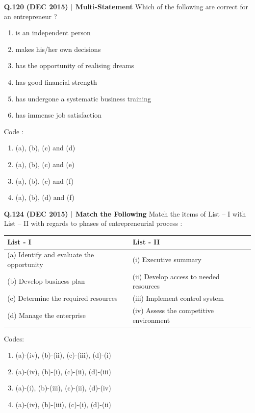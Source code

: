 \documentclass{article}
\begin{document}
\textbf{Q.120 (DEC 2015) | Multi-Statement}
Which of the following are correct for an entrepreneur ?
\begin{enumerate}[label=(\alph*)]
    \item is an independent person
    \item makes his/her own decisions
    \item has the opportunity of realising dreams
    \item has good financial strength
    \item has undergone a systematic business training
    \item has immense job satisfaction
\end{enumerate}
Code :
\begin{enumerate}[label=(\arabic*)]
    \item (a), (b), (c) and (d)
    \item (a), (b), (c) and (e)
    \item (a), (b), (c) and (f)
    \item (a), (b), (d) and (f)
\end{enumerate}

\textbf{Q.124 (DEC 2015) | Match the Following}
Match the items of List – I with List – II with regards to phases of entrepreneurial process :
\begin{tabularx}{\linewidth}{@{} l X @{}}
    \toprule
    \textbf{List - I} & \textbf{List - II} \\
    \midrule
    (a) Identify and evaluate the opportunity & (i) Executive summary \\
    (b) Develop business plan & (ii) Develop access to needed resources \\
    (c) Determine the required resources & (iii) Implement control system \\
    (d) Manage the enterprise & (iv) Assess the competitive environment \\
    \bottomrule
\end{tabularx}
Codes:
\begin{enumerate}[label=(\arabic*)]
    \item (a)-(iv), (b)-(ii), (c)-(iii), (d)-(i)
    \item (a)-(iv), (b)-(i), (c)-(ii), (d)-(iii)
    \item (a)-(i), (b)-(iii), (c)-(ii), (d)-(iv)
    \item (a)-(iv), (b)-(iii), (c)-(i), (d)-(ii)
\end{enumerate}
\end{document}
